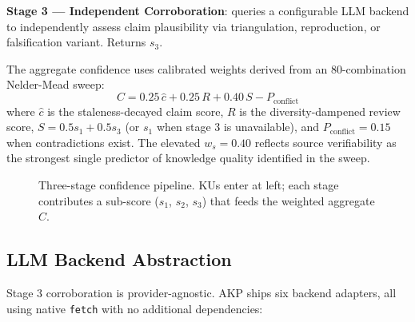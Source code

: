 \documentclass[10pt,twocolumn]{article}
\begin{document}
\textbf{Stage 3 — Independent Corroboration}: queries a configurable LLM
backend to independently assess claim plausibility via triangulation,
reproduction, or falsification variant. Returns $s_3$.

The aggregate confidence uses calibrated weights derived from an 80-combination
Nelder-Mead sweep:
\[
  C = 0.25\,\hat{c} + 0.25\,R + 0.40\,S - P_{\text{conflict}}
\]
where $\hat{c}$ is the staleness-decayed claim score, $R$ is the
diversity-dampened review score, $S = 0.5 s_1 + 0.5 s_3$ (or $s_1$ when
stage 3 is unavailable), and $P_{\text{conflict}} = 0.15$ when contradictions
exist. The elevated $w_s = 0.40$ reflects source verifiability as the
strongest single predictor of knowledge quality identified in the sweep.

\begin{figure}[t]

\caption{Three-stage confidence pipeline. KUs enter at left; each stage contributes a sub-score ($s_1$, $s_2$, $s_3$) that feeds the weighted aggregate $C$.}
\label{fig:pipeline}
\end{figure}

\subsection{LLM Backend Abstraction}

Stage 3 corroboration is provider-agnostic. AKP ships six backend adapters,
all using native \texttt{fetch} with no additional dependencies:
\end{document}
